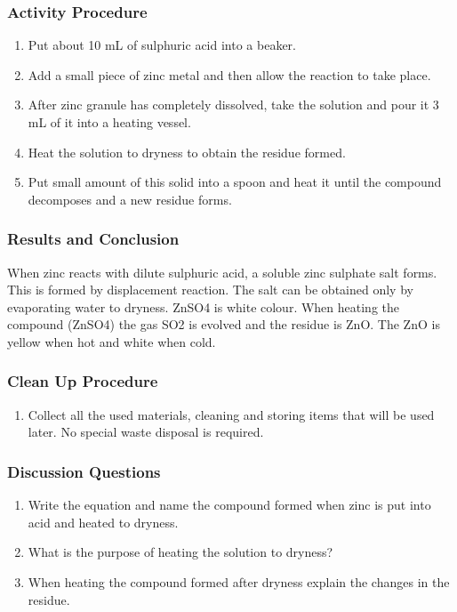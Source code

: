 \subsubsection*{Activity Procedure}
\begin{enumerate}
\item{Put about 10 mL of sulphuric acid into a beaker.}
\item{Add a small piece of zinc metal and then allow the reaction to take place.}
\item{After zinc granule has completely dissolved, take the solution and pour it 3 mL of it into a heating vessel.}
\item{Heat the solution to dryness to obtain the residue formed.}
\item{Put small amount of this solid into a spoon and heat it until the compound decomposes and a new residue forms.}
\end{enumerate}

\subsubsection*{Results and Conclusion}
When zinc reacts with dilute sulphuric acid, a soluble zinc sulphate salt forms. This is formed by displacement reaction. The salt can be obtained only by evaporating water to dryness. ZnSO4 is white colour. When heating the compound (ZnSO4) the gas SO2 is evolved and the residue is ZnO. The ZnO is yellow when hot and white when cold.

\subsubsection*{Clean Up Procedure}
\begin{enumerate}
\item{Collect all the used materials, cleaning and storing items that will be used later. No special waste disposal is required.}
\end{enumerate}

\subsubsection*{Discussion Questions}
\begin{enumerate}
\item{Write the equation and name the compound formed when zinc is put into acid and heated to dryness.}
\item{What is the purpose of heating the solution to dryness?}
\item{When heating the compound formed after dryness explain the changes in the residue.}
\end{enumerate}

